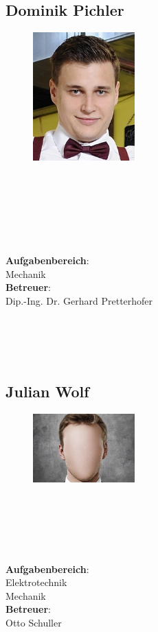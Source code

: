 \subsection*{Dominik Pichler}
\begin{figure}
\begin{center}
  \includegraphics[width=0.35\textwidth]{Bilder/Fotos/Pichler}
\end{center}
\end{figure}
\mbox{}\\
\mbox{}\\
\mbox{}\\
\mbox{}\\
\mbox{}\\
\mbox{}\\
\textbf{Aufgabenbereich}:\\
Mechanik\\
\textbf{Betreuer}:\\
Dip.-Ing. Dr. Gerhard Pretterhofer
\mbox{}\\
\mbox{}\\
\mbox{}\\
\mbox{}\\
\mbox{}\\

\subsection*{Julian Wolf}
\begin{figure}
\begin{center}
  \includegraphics[width=0.35\textwidth]{Bilder/face.jpg}
\end{center}
\end{figure}
\mbox{}\\
\mbox{}\\
\mbox{}\\
\mbox{}\\
\mbox{}\\
\textbf{Aufgabenbereich}:\\
Elektrotechnik\\
Mechanik\\
\textbf{Betreuer}:\\
Otto Schuller
